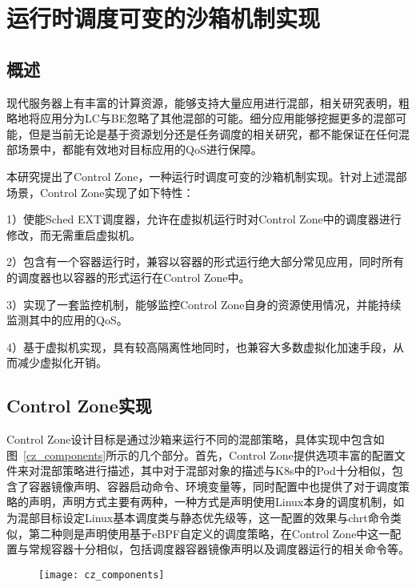 \chapter{运行时调度可变的沙箱机制实现}\label{chap:control_zone}

\section{概述}


现代服务器上有丰富的计算资源，能够支持大量应用进行混部，相关研究表明，粗略地将应用分为LC与BE忽略了其他混部的可能。细分应用能够挖掘更多的混部可能，但是当前无论是基于资源划分还是任务调度的相关研究，都不能保证在任何混部场景中，都能有效地对目标应用的QoS进行保障。

本研究提出了Control Zone，一种运行时调度可变的沙箱机制实现。针对上述混部场景，Control Zone实现了如下特性：

1）使能Sched EXT调度器，允许在虚拟机运行时对Control Zone中的调度器进行修改，而无需重启虚拟机。

2）包含有一个容器运行时，兼容以容器的形式运行绝大部分常见应用，同时所有的调度器也以容器的形式运行在Control Zone中。

3）实现了一套监控机制，能够监控Control Zone自身的资源使用情况，并能持续监测其中的应用的QoS。

4）基于虚拟机实现，具有较高隔离性地同时，也兼容大多数虚拟化加速手段，从而减少虚拟化开销。

\section{Control Zone实现}

Control Zone设计目标是通过沙箱来运行不同的混部策略，具体实现中包含如图~\ref{cz_components}所示的几个部分。首先，Control Zone提供选项丰富的配置文件来对混部策略进行描述，其中对于混部对象的描述与K8s中的Pod十分相似，包含了容器镜像声明、容器启动命令、环境变量等，同时配置中也提供了对于调度策略的声明，声明方式主要有两种，一种方式是声明使用Linux本身的调度机制，如为混部目标设定Linux基本调度类与静态优先级等，这一配置的效果与chrt命令类似，第二种则是声明使用基于eBPF自定义的调度策略，在Control Zone中这一配置与常规容器十分相似，包括调度器容器镜像声明以及调度器运行的相关命令等。

\begin{figure}[!htbp]
    \centering
    \texttt{[image: cz\_components]}
    \label{fig:cz_components}
\end{figure}

